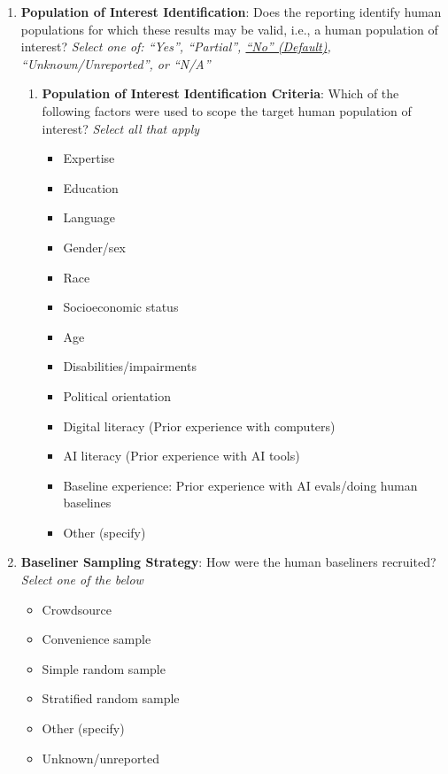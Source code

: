 \documentclass{article}
\begin{document}
\begin{enumerate}[leftmargin=30pt, topsep=0pt, itemsep=0pt]
    \item \textbf{Population of Interest Identification}: Does the reporting identify human populations for which these results may be valid, i.e., a human population of interest?
    \newline \textit{Select one of: ``Yes'', ``Partial'', \ul{``No'' (Default)}, ``Unknown/Unreported'', or ``N/A''}
    \begin{enumerate}
        \item \textbf{Population of Interest Identification Criteria}: Which of the following factors were used to scope the target human population of interest?
        \newline \textit{Select all that apply}
        \begin{itemize}
            \item Expertise
            \item Education
            \item Language
            \item Gender/sex
            \item Race
            \item Socioeconomic status
            \item Age
            \item Disabilities/impairments
            \item Political orientation
            \item Digital literacy (Prior experience with computers)
            \item AI literacy (Prior experience with AI tools)
            \item Baseline experience: Prior experience with AI evals/doing human baselines 
            \item Other (specify)
        \end{itemize}
    \end{enumerate}
    
    \item \textbf{Baseliner Sampling Strategy}: How were the human baseliners recruited? 
    \newline \textit{Select one of the below}
    \begin{itemize}
        \item Crowdsource
        \item Convenience sample
        \item Simple random sample
        \item Stratified random sample
        \item Other (specify)
        \item Unknown/unreported
    \end{itemize}
    

\end{enumerate}
\end{document}
